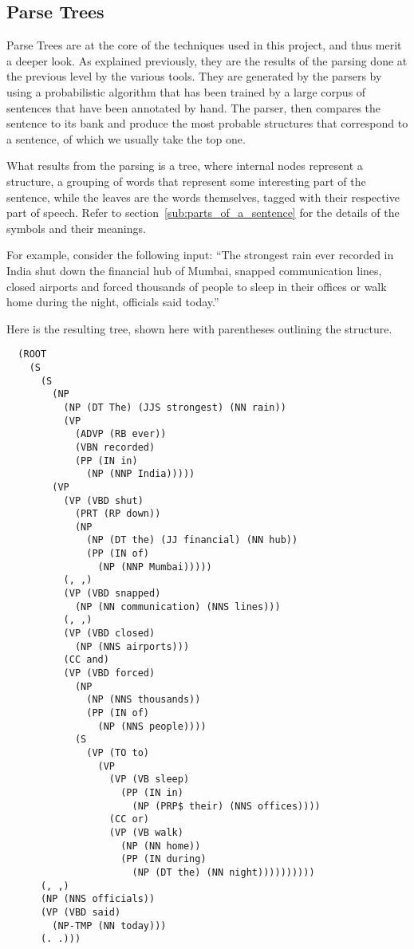 
\subsection{Parse Trees} %
\label{sub:parse_trees}

Parse Trees are at the core of the techniques used in this project, and thus merit a deeper look. As explained previously, they are the results of the parsing done at the previous level by the various tools. They are generated by the parsers by using a probabilistic algorithm that has been trained by a large corpus of sentences that have been annotated by hand. The parser, then compares the sentence to its bank and produce the most probable structures that correspond to a sentence, of which we usually take the top one.

What results from the parsing is a tree, where internal nodes represent a structure, a grouping of words that represent some interesting part of the sentence, while the leaves are the words themselves, tagged with their respective part of speech. Refer to section~\ref{sub:parts_of_a_sentence} for the details of the symbols and their meanings.

For example, consider the following input: ``The strongest rain ever recorded in India shut down the financial hub of Mumbai, snapped communication lines, closed airports and forced thousands of people to sleep in their offices or walk home during the night, officials said today.''

Here is the resulting tree, shown here with parentheses outlining the structure.
\begin{verbatim}
  (ROOT
    (S
      (S
        (NP
          (NP (DT The) (JJS strongest) (NN rain))
          (VP
            (ADVP (RB ever))
            (VBN recorded)
            (PP (IN in)
              (NP (NNP India)))))
        (VP
          (VP (VBD shut)
            (PRT (RP down))
            (NP
              (NP (DT the) (JJ financial) (NN hub))
              (PP (IN of)
                (NP (NNP Mumbai)))))
          (, ,)
          (VP (VBD snapped)
            (NP (NN communication) (NNS lines)))
          (, ,)
          (VP (VBD closed)
            (NP (NNS airports)))
          (CC and)
          (VP (VBD forced)
            (NP
              (NP (NNS thousands))
              (PP (IN of)
                (NP (NNS people))))
            (S
              (VP (TO to)
                (VP
                  (VP (VB sleep)
                    (PP (IN in)
                      (NP (PRP$ their) (NNS offices))))
                  (CC or)
                  (VP (VB walk)
                    (NP (NN home))
                    (PP (IN during)
                      (NP (DT the) (NN night))))))))))
      (, ,)
      (NP (NNS officials))
      (VP (VBD said)
        (NP-TMP (NN today)))
      (. .)))
\end{verbatim}

